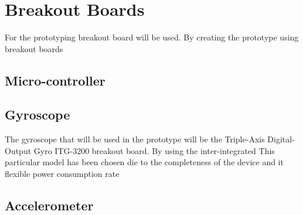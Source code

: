 \documentclass{report}
\begin{document}
\section{Breakout Boards}
For the prototyping breakout board will be used. By creating the prototype using breakout boards
 
\subsection{Micro-controller}

\subsection{Gyroscope}
The gyroscope that will be used in the prototype will be the Triple-Axis Digital-Output Gyro ITG-3200 breakout board. By using the inter-integrated 
  This particular model has been chosen die to the completeness of the device and it flexible power consumption rate 
\subsection{Accelerometer}






 
\end{document}
